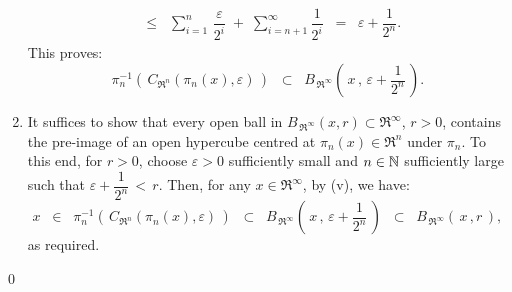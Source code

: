 \begin{enumerate}
\begin{eqnarray*}
		\;\;\leq\;\; \sum^{n}_{i=1}\,\dfrac{\varepsilon}{2^{i}} \;+\; \sum^{\infty}_{i=n+1}\dfrac{1}{2^{i}}
		\;\;=\;\; \varepsilon + \dfrac{1}{2^{n}}.
	\end{eqnarray*}
	This proves:
	\begin{equation*}
	\pi_{n}^{-1}\!\left(\,C_{\Re^{n}}(\pi_{n}(x),\varepsilon)\,\right)
	\;\;\subset\;\; B_{\mbox{}\,\Re^{\infty}}\!\left(\,x\,,\,\varepsilon + \dfrac{1}{2^{n}}\,\right).
	\end{equation*}
\item
	It suffices to show that every open ball in
	$B_{\mbox{}\,\Re^{\infty}}\!\left(x,r\right) \subset \Re^{\infty}$, $r > 0$,
	contains the pre-image of an open hypercube centred at $\pi_{n}(x) \in \Re^{n}$
	under $\pi_{n}$.
	To this end, for $r > 0$,
	choose $\varepsilon > 0$ sufficiently small and $n \in \mathbb{N}$ sufficiently large
	such that $\varepsilon + \dfrac{1}{2^{n}} \, < \, r$.
	Then, for any $x \in \Re^{\infty}$, by (v), we have:
	\begin{equation*}
	x
	\;\;\in\;\; \pi_{n}^{-1}\!\left(\,C_{\Re^{n}}(\pi_{n}(x),\varepsilon)\,\right)
	\;\;\subset\;\; B_{\mbox{}\,\Re^{\infty}}\!\left(\,x\,,\,\varepsilon + \dfrac{1}{2^{n}}\,\right)
	\;\;\subset\;\; B_{\mbox{}\,\Re^{\infty}}\!\left(\,x\,,r\,\right),
	\end{equation*}
	as required.
\end{enumerate}
\qed


